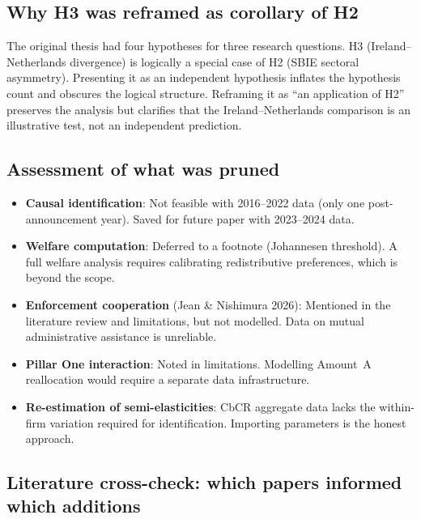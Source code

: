 \documentclass[11pt,a4paper]{article}
\begin{document}
\subsection{Why H3 was reframed as corollary of H2}

The original thesis had four hypotheses for three research questions. H3 (Ireland--Netherlands divergence) is logically a special case of H2 (SBIE sectoral asymmetry). Presenting it as an independent hypothesis inflates the hypothesis count and obscures the logical structure. Reframing it as ``an application of H2'' preserves the analysis but clarifies that the Ireland--Netherlands comparison is an illustrative test, not an independent prediction.

\subsection{Assessment of what was pruned}

\begin{itemize}[noitemsep]
\item \textbf{Causal identification}: Not feasible with 2016--2022 data (only one post-announcement year). Saved for future paper with 2023--2024 data.
\item \textbf{Welfare computation}: Deferred to a footnote (Johannesen threshold). A full welfare analysis requires calibrating redistributive preferences, which is beyond the scope.
\item \textbf{Enforcement cooperation} (Jean \& Nishimura 2026): Mentioned in the literature review and limitations, but not modelled. Data on mutual administrative assistance is unreliable.
\item \textbf{Pillar One interaction}: Noted in limitations. Modelling Amount~A reallocation would require a separate data infrastructure.
\item \textbf{Re-estimation of semi-elasticities}: CbCR aggregate data lacks the within-firm variation required for identification. Importing parameters is the honest approach.
\end{itemize}

\subsection{Literature cross-check: which papers informed which additions}
\end{document}
